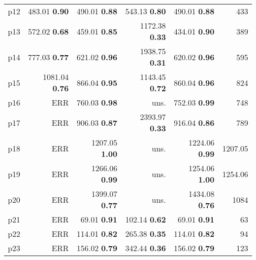 \begin{tabular}{lrrrrr}
\multicolumn{1}{l|}{p12} & {\footnotesize 483.01} \textbf{0.90} & {\footnotesize 490.01} \textbf{0.88} & {\footnotesize 543.13} \textbf{0.80} & {\footnotesize 490.01} \textbf{0.88} & \multicolumn{1}{|r}{433}\\
\multicolumn{1}{l|}{p13} & {\footnotesize 572.02} \textbf{0.68} & {\footnotesize 459.01} \textbf{0.85} & {\footnotesize 1172.38} \textbf{0.33} & {\footnotesize 434.01} \textbf{0.90} & \multicolumn{1}{|r}{389}\\
\multicolumn{1}{l|}{p14} & {\footnotesize 777.03} \textbf{0.77} & {\footnotesize 621.02} \textbf{0.96} & {\footnotesize 1938.75} \textbf{0.31} & {\footnotesize 620.02} \textbf{0.96} & \multicolumn{1}{|r}{595}\\
\multicolumn{1}{l|}{p15} & {\footnotesize 1081.04} \textbf{0.76} & {\footnotesize 866.04} \textbf{0.95} & {\footnotesize 1143.45} \textbf{0.72} & {\footnotesize 860.04} \textbf{0.96} & \multicolumn{1}{|r}{824}\\
\multicolumn{1}{l|}{p16} & ERR & {\footnotesize 760.03} \textbf{0.98} & uns. & {\footnotesize 752.03} \textbf{0.99} & \multicolumn{1}{|r}{748}\\
\multicolumn{1}{l|}{p17} & ERR & {\footnotesize 906.03} \textbf{0.87} & {\footnotesize 2393.97} \textbf{0.33} & {\footnotesize 916.04} \textbf{0.86} & \multicolumn{1}{|r}{789}\\
\multicolumn{1}{l|}{p18} & ERR & {\footnotesize 1207.05} \textbf{1.00} & uns. & {\footnotesize 1224.06} \textbf{0.99} & \multicolumn{1}{|r}{1207.05}\\
\multicolumn{1}{l|}{p19} & ERR & {\footnotesize 1266.06} \textbf{0.99} & uns. & {\footnotesize 1254.06} \textbf{1.00} & \multicolumn{1}{|r}{1254.06}\\
\multicolumn{1}{l|}{p20} & ERR & {\footnotesize 1399.07} \textbf{0.77} & uns. & {\footnotesize 1434.08} \textbf{0.76} & \multicolumn{1}{|r}{1084}\\
\multicolumn{1}{l|}{p21} & ERR & {\footnotesize 69.01} \textbf{0.91} & {\footnotesize 102.14} \textbf{0.62} & {\footnotesize 69.01} \textbf{0.91} & \multicolumn{1}{|r}{63}\\
\multicolumn{1}{l|}{p22} & ERR & {\footnotesize 114.01} \textbf{0.82} & {\footnotesize 265.38} \textbf{0.35} & {\footnotesize 114.01} \textbf{0.82} & \multicolumn{1}{|r}{94}\\
\multicolumn{1}{l|}{p23} & ERR & {\footnotesize 156.02} \textbf{0.79} & {\footnotesize 342.44} \textbf{0.36} & {\footnotesize 156.02} \textbf{0.79} & \multicolumn{1}{|r}{123}\\

\end{tabular}
